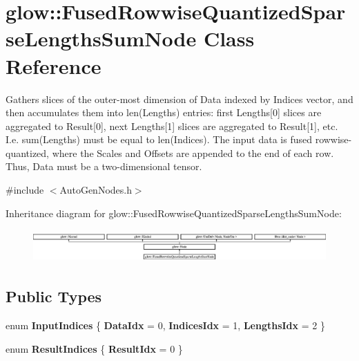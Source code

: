 \hypertarget{classglow_1_1_fused_rowwise_quantized_sparse_lengths_sum_node}{}\section{glow\+:\+:Fused\+Rowwise\+Quantized\+Sparse\+Lengths\+Sum\+Node Class Reference}
\label{classglow_1_1_fused_rowwise_quantized_sparse_lengths_sum_node}


Gathers slices of the outer-\/most dimension of Data indexed by Indices vector, and then accumulates them into len(\+Lengths) entries\+: first Lengths\mbox{[}0\mbox{]} slices are aggregated to Result\mbox{[}0\mbox{]}, next Lengths\mbox{[}1\mbox{]} slices are aggregated to Result\mbox{[}1\mbox{]}, etc. I.\+e. sum(\+Lengths) must be equal to len(\+Indices). The input data is fused rowwise-\/quantized, where the Scales and Offsets are appended to the end of each row. Thus, Data must be a two-\/dimensional tensor.  




{\ttfamily \#include $<$Auto\+Gen\+Nodes.\+h$>$}

Inheritance diagram for glow\+:\+:Fused\+Rowwise\+Quantized\+Sparse\+Lengths\+Sum\+Node\+:\begin{figure}[H]
\begin{center}
\leavevmode
\includegraphics[height=1.268882cm]{classglow_1_1_fused_rowwise_quantized_sparse_lengths_sum_node}
\end{center}
\end{figure}
\subsection*{Public Types}
\begin{DoxyCompactItemize}
\item 
\mbox{\label{classglow_1_1_fused_rowwise_quantized_sparse_lengths_sum_node_aef3bf1a19011175060a914812ac3b866}} 
enum {\bfseries Input\+Indices} \{ {\bfseries Data\+Idx} = 0, 
{\bfseries Indices\+Idx} = 1, 
{\bfseries Lengths\+Idx} = 2
 \}
\item 
\mbox{\label{classglow_1_1_fused_rowwise_quantized_sparse_lengths_sum_node_a33f84fa6a6a3dfb71d34eed575a89b81}} 
enum {\bfseries Result\+Indices} \{ {\bfseries Result\+Idx} = 0
 \}
\end{DoxyCompactItemize}
